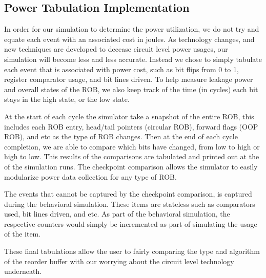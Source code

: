 \subsection{Power Tabulation Implementation}
In order for our simulation to determine the power utilization, we do not try and equate each event with an associated cost in joules.  As technology changes, and new techniques are developed to decease circuit level power usages, our simulation will become less and less accurate.  Instead we chose to simply tabulate each event that is associated with power cost, such as bit flips from 0 to 1, register comparator usage, and bit lines driven.  To help measure leakage power and overall states of the ROB, we also keep track of the time (in cycles) each bit stays in the high state, or the low state.

At the start of each cycle the simulator take a snapshot of the entire ROB, this includes each ROB entry, head/tail pointers (circular ROB), forward flags (OOP ROB), and etc as the type of ROB changes.  Then at the end of each cycle completion, we are able to compare which bits have changed, from low to high or high to low.   This results of the comparisons are tabulated
and printed out at the of the simulation runs.  The checkpoint comparison allows the simulator to easily modularize power data collection for any type of ROB.

The events that cannot be captured by the checkpoint comparison, is captured during the behavioral simulation.  These items are stateless such as comparators used, bit lines driven, and etc.
As part of the behavioral simulation, the respective counters would simply be incremented as part of simulating the usage of the item.

These final tabulations allow the user to fairly comparing the type and algorithm of the reorder buffer with our worrying about the circuit level technology underneath.





























